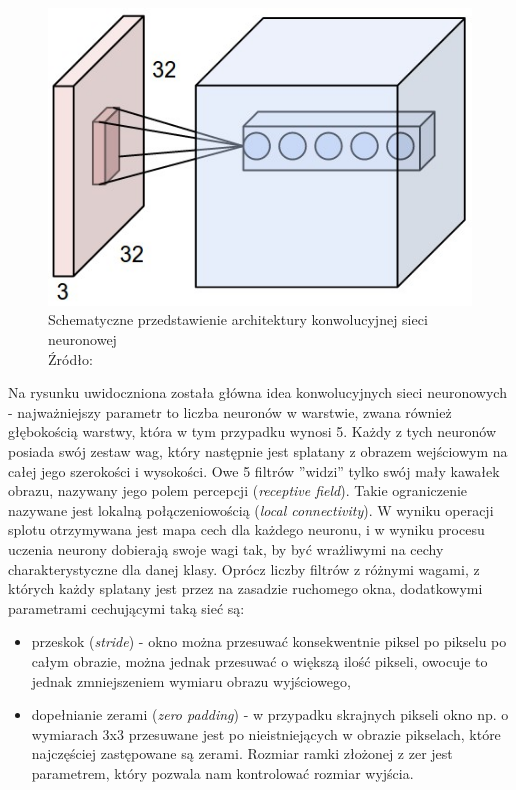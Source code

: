 \begin{figure}[h!tb]
	 \centering
	 \includegraphics[width = 1.0\linewidth]{img/cnn}
	 \caption{Schematyczne przedstawienie architektury konwolucyjnej sieci neuronowej \\
              Źródło: \cite{cs231n}}
	 \label{fig:cnn}
\end{figure}

Na rysunku uwidoczniona została główna idea konwolucyjnych sieci neuronowych - najważniejszy parametr to liczba neuronów w warstwie, zwana również głębokością warstwy, która w tym przypadku wynosi 5.
Każdy z tych neuronów posiada swój zestaw wag, który następnie jest splatany z obrazem wejściowym na całej jego szerokości i wysokości.
Owe 5 filtrów ''widzi'' tylko swój mały kawałek obrazu, nazywany jego polem percepcji (\textit{receptive field}).
Takie ograniczenie nazywane jest lokalną połączeniowością (\textit{local connectivity}).
W wyniku operacji splotu otrzymywana jest mapa cech dla każdego neuronu, i w wyniku procesu uczenia neurony dobierają swoje wagi tak, by być wrażliwymi na cechy charakterystyczne dla danej klasy.
Oprócz liczby filtrów z różnymi wagami, z których każdy splatany jest przez na zasadzie ruchomego okna, dodatkowymi parametrami cechującymi taką sieć są:

\begin{itemize}
	\item przeskok (\textit{stride}) - okno można przesuwać konsekwentnie piksel po pikselu po całym obrazie, można jednak przesuwać o większą ilość pikseli, owocuje to jednak zmniejszeniem wymiaru obrazu wyjściowego,
	\item dopełnianie zerami (\textit{zero padding}) - w przypadku skrajnych pikseli okno np. o wymiarach 3x3 przesuwane jest po nieistniejących w obrazie pikselach, które najczęściej zastępowane są zerami.
	 			Rozmiar ramki złożonej z zer jest parametrem, który pozwala nam kontrolować rozmiar wyjścia.
\end{itemize}

